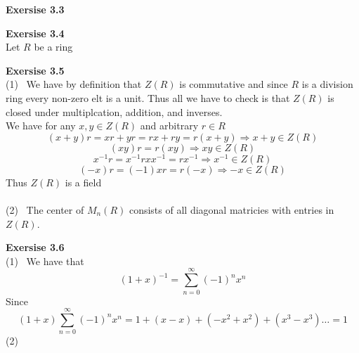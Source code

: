 \documentclass[12pt]{article}
\newenvironment{ques}[1]{\textbf{Exersise #1}\vspace{1 mm}\\ }{\bigskip}
\theoremstyle{definition}
\begin{document}
\begin{ques}{3.3}
\end{ques}

\begin{ques}{3.4}
	Let $R$ be a ring
\end{ques}

\begin{ques}{3.5}
	(1) \ We have by definition that $Z(R)$ is commutative and since $R$ is a
	division ring every non-zero
	elt is a unit. Thus all we have to check is that $Z(R)$ is closed under
	multiplcation, addition, and inverses.\\
	We have for any $x, y \in Z(R)$ and arbitrary $r \in R$
	$$(x + y)r = xr + yr = rx + ry = r(x + y) \Rightarrow x + y \in Z(R)$$
	$$(xy)r = r(xy) \Rightarrow xy \in Z(R)$$
	$$x^{-1}r = x^{-1}rxx^{-1} = rx^{-1}\Rightarrow x^{-1} \in Z(R)$$
	$$(-x)r = (-1)xr = r(-x)\Rightarrow -x \in Z(R)$$
	Thus $Z(R)$ is a field\\
	\\
	(2) \ The center of $M_n(R)$ consists of all diagonal matricies with
	entries in $Z(R)$.
\end{ques}

\begin{ques}{3.6}
	(1) \ We have that
	$$(1 + x)^{-1} = \sum^{\infty}_{n=0} (-1)^nx^n$$
	Since
	$$(1 + x)\sum^{\infty}_{n=0} (-1)^nx^n = 1 + (x - x) + (-x^2 + x^2) + (x^3
	- x^3) \dots = 1$$
	(2)
\end{ques}
\end{document}
